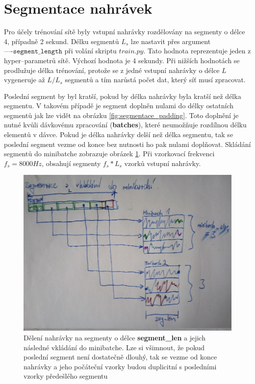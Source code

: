 
\section{Segmentace nahrávek}
\label{sec:segmentace}
Pro účely trénování sítě byly vstupní nahrávky rozdělovány na segmenty o délce 4, případně 2 sekund. Délku segmentů $L_s$ lze nastavit přes argument $\texttt{----segment\_length}$ při volání skriptu $train.py$. Tato hodnota reprezentuje jeden z hyper--parametrů sítě. Výchozí hodnota je 4 sekundy. Při nižších hodnotách se prodlužuje délka trénování, protože se z jedné vstupní nahrávky o délce $L$ vygeneruje až $L/L_s$  segmentů a tím narůstá počet dat, který síť musí zpracovat. 

Poslední segment by byl kratší, pokud by délka nahrávky byla kratší než délka segmentu. V takovém případě je segment doplněn nulami do délky ostatních segmentů jak lze vidět na obrázku \ref{fig:segmentace_padding}. Toto doplnění je nutné kvůli dávkovému zpracování (\textbf{batches}), které neumožňuje rozdílnou délku elementů v dávce. Pokud je délka nahrávky delší než délka segmentu, tak se poslední segment vezme od konce bez nutnosti ho pak nulami doplňovat. Skládání segmentů do minibatche zobrazuje obrázek \ref{fig:minibatch_segmentace}. Při vzorkovací frekvenci $f_s = 8000Hz$, obsahují segmenty $f_s * L_s$ vzorků vstupní nahrávky. 

\begin{figure}[H]
    \centering
    \includegraphics[scale=0.30]{obrazky-figures/minibatch_segmentace.jpg}
    \caption{\label{fig:minibatch_segmentace}Dělení nahrávky na segmenty o délce \textbf{segment\_len} a jejich následné vkládání do minibatche. Lze si všimnout, že pokud poslední segment není dostatečně dlouhý, tak se vezme od konce nahrávky a jeho počáteční vzorky budou duplicitní s posledními vzorky předešlého segmentu}
\end{figure}

